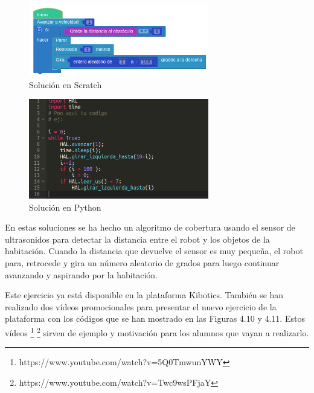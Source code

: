 \begin{figure}[H]
    \centering
    \includegraphics[width=0.7\textwidth, height=0.27\textwidth]{chapters/images/solucionroombascratch.png}
    \caption{Solución en Scratch }
    \label{fig:my_label}
\end{figure}
\begin{figure}[H]
    \centering
    \includegraphics[width=0.7\textwidth, height=0.27\textwidth]{chapters/images/solucionroombapython.png}
    \caption{Solución en Python}
    \label{fig:my_label}
\end{figure}

En estas soluciones se ha hecho un algoritmo de cobertura usando el sensor de ultrasonidos para detectar la distancia entre el robot y los objetos de la habitación. Cuando la distancia que devuelve el sensor es muy pequeña, el robot para, retrocede y gira un número aleatorio de grados para luego continuar avanzando y aspirando por la habitación.

Este ejercicio ya está disponible en la plataforma Kibotics. También se han realizado dos vídeos promocionales para presentar el nuevo ejercicio de la plataforma con los códigos que se han mostrado en las Figuras 4.10 y 4.11. Estos vídeos \footnote{https://www.youtube.com/watch?v=5Q0TmwunYWY} \footnote{https://www.youtube.com/watch?v=Twc9wsPFjaY} sirven de ejemplo y motivación para los alumnos que vayan a realizarlo.